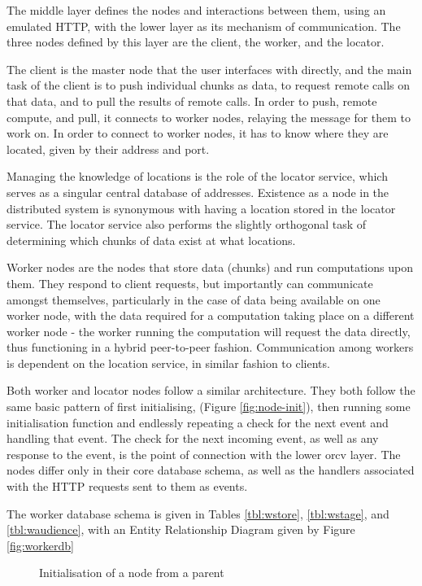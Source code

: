 The middle layer  defines the nodes and interactions between them, using an emulated HTTP, with the lower  layer as its mechanism of communication.
The three nodes defined by this layer are the client, the worker, and the locator.

The client is the master node that the user interfaces with directly, and the main task of the client is to push individual chunks as data, to request remote calls on that data, and to pull the results of remote calls.
In order to push, remote compute, and pull, it connects to worker nodes, relaying the message for them to work on.
In order to connect to worker nodes, it has to know where they are located, given by their address and port.

Managing the knowledge of locations is the role of the locator service, which serves as a singular central database of addresses.
Existence as a node in the distributed system is synonymous with having a location stored in the locator service.
The locator service also performs the slightly orthogonal task of determining which chunks of data exist at what locations.

Worker nodes are the nodes that store data (chunks) and run computations upon them.
They respond to client requests, but importantly can communicate amongst themselves, particularly in the case of data being available on one worker node, with the data required for a computation taking place on a different worker node - the worker running the computation will request the data directly, thus functioning in a hybrid peer-to-peer fashion.
Communication among workers is dependent on the location service, in similar fashion to clients.

Both worker and locator nodes follow a similar architecture.
They both follow the same basic pattern of first initialising, (Figure \ref{fig:node-init}), then running some initialisation function and endlessly repeating a check for the next event and handling that event.
The check for the next incoming event, as well as any response to the event, is the point of connection with the lower orcv layer.
The nodes differ only in their core database schema, as well as the handlers associated with the HTTP requests sent to them as events.

The worker database schema is given in Tables \ref{tbl:wstore}, \ref{tbl:wstage}, and \ref{tbl:waudience}, with an Entity Relationship Diagram given by Figure \ref{fig:workerdb}

\begin{figure}

\caption{Initialisation of a node from a parent}
\end{figure}


